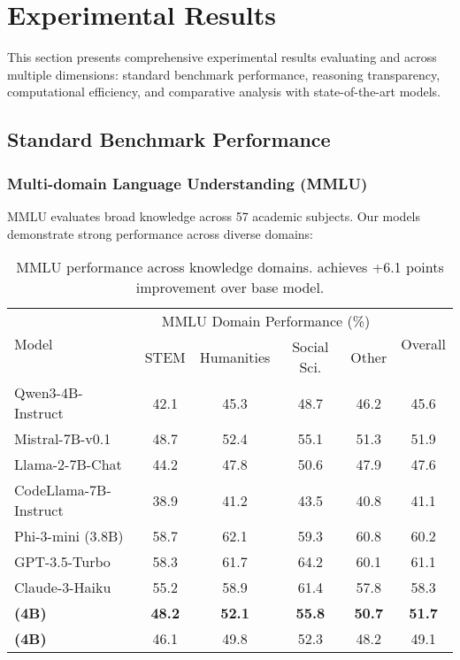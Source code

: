 \section{Experimental Results}
\label{sec:results}

This section presents comprehensive experimental results evaluating \supra{} and \zennano{} across multiple dimensions: standard benchmark performance, reasoning transparency, computational efficiency, and comparative analysis with state-of-the-art models.

\subsection{Standard Benchmark Performance}

\subsubsection{Multi-domain Language Understanding (MMLU)}

MMLU evaluates broad knowledge across 57 academic subjects. Our models demonstrate strong performance across diverse domains:

\begin{table}[H]
\centering
\begin{tabular}{lccccc}
\toprule
\multirow{2}{*}{Model} & \multicolumn{4}{c}{MMLU Domain Performance (\%)} & \multirow{2}{*}{Overall} \\
\cmidrule(lr){2-5}
& STEM & Humanities & Social Sci. & Other & \\
\midrule
Qwen3-4B-Instruct & 42.1 & 45.3 & 48.7 & 46.2 & 45.6 \\
Mistral-7B-v0.1 & 48.7 & 52.4 & 55.1 & 51.3 & 51.9 \\
Llama-2-7B-Chat & 44.2 & 47.8 & 50.6 & 47.9 & 47.6 \\
CodeLlama-7B-Instruct & 38.9 & 41.2 & 43.5 & 40.8 & 41.1 \\
Phi-3-mini (3.8B) & 58.7 & 62.1 & 59.3 & 60.8 & 60.2 \\
GPT-3.5-Turbo & 58.3 & 61.7 & 64.2 & 60.1 & 61.1 \\
Claude-3-Haiku & 55.2 & 58.9 & 61.4 & 57.8 & 58.3 \\
\midrule
\textbf{\supra{} (4B)} & \textbf{48.2} & \textbf{52.1} & \textbf{55.8} & \textbf{50.7} & \textbf{51.7} \\
\textbf{\zennano{} (4B)} & 46.1 & 49.8 & 52.3 & 48.2 & 49.1 \\
\bottomrule
\end{tabular}
\caption{MMLU performance across knowledge domains. \supra{} achieves +6.1 points improvement over base model.}
\label{tab:mmlu-results}
\end{table}

